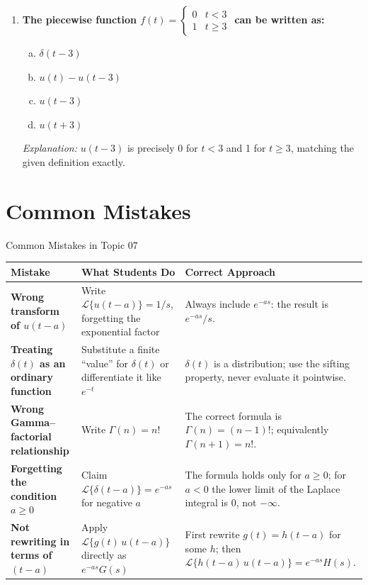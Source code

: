 \documentclass[12pt,a4paper]{article}
\begin{document}
\begin{enumerate}
\item \textbf{The piecewise function
$f(t) = \begin{cases} 0 & t < 3 \\ 1 & t \geq 3 \end{cases}$
can be written as:}
\begin{enumerate}[(a)]
  \item $\delta(t-3)$
  \item $u(t) - u(t-3)$
  \item \textbf{$u(t-3)$}
  \item $u(t+3)$
\end{enumerate}
\textit{Explanation:} $u(t-3)$ is precisely 0 for $t < 3$ and 1 for $t \geq 3$,
matching the given definition exactly.

\end{enumerate}

\section{Common Mistakes}

\begin{mistakebox}{Common Mistakes in Topic 07}
\begin{tabular}{>{\bfseries}p{4.5cm} p{4.5cm} p{5cm}}
\toprule
Mistake & What Students Do & Correct Approach \\
\midrule
Wrong transform of $u(t-a)$ &
  Write $\mathcal{L}\{u(t-a)\} = 1/s$, forgetting the exponential factor &
  Always include $e^{-as}$: the result is $e^{-as}/s$. \\
\midrule
Treating $\delta(t)$ as an ordinary function &
  Substitute a finite ``value'' for $\delta(t)$ or differentiate it like $e^{-t}$ &
  $\delta(t)$ is a distribution; use the sifting property, never evaluate it
  pointwise. \\
\midrule
Wrong Gamma--factorial relationship &
  Write $\Gamma(n) = n!$ &
  The correct formula is $\Gamma(n) = (n-1)!$; equivalently
  $\Gamma(n+1) = n!$. \\
\midrule
Forgetting the condition $a \geq 0$ &
  Claim $\mathcal{L}\{\delta(t-a)\} = e^{-as}$ for negative $a$ &
  The formula holds only for $a \geq 0$; for $a < 0$ the lower limit
  of the Laplace integral is 0, not $-\infty$. \\
\midrule
Not rewriting in terms of $(t-a)$ &
  Apply $\mathcal{L}\{g(t)\,u(t-a)\}$ directly as $e^{-as}G(s)$ &
  First rewrite $g(t) = h(t-a)$ for some $h$; then
  $\mathcal{L}\{h(t-a)\,u(t-a)\} = e^{-as}H(s)$. \\
\bottomrule
\end{tabular}
\end{mistakebox}
\end{document}
